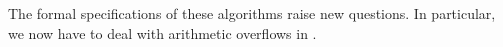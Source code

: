 The formal specifications of these algorithms raise new questions.
In particular, we now have to deal with arithmetic overflows in .

\clearpage








